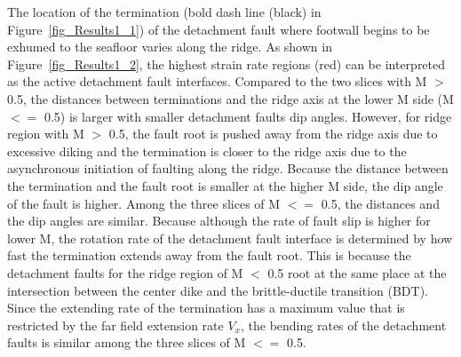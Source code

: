 The location of the termination (bold dash line (black) in Figure~\hyperref[fig_Results1_1]{\ref{fig_Results1_1}}) of the detachment fault where footwall begins to be exhumed to the seafloor varies along the ridge. As shown in Figure~\hyperref[fig_Results1_2]{\ref{fig_Results1_2}}, the highest strain rate regions (red) can be interpreted as the active detachment fault interfaces. Compared to the two slices with M $>$ 0.5, the distances between terminations and the ridge axis at the lower M side (M $<=$ 0.5) is larger with smaller detachment faults dip angles. However, for ridge region with M $>$ 0.5, the fault root is pushed away from the ridge axis due to excessive diking and the termination is closer to the ridge axis due to the asynchronous initiation of faulting along the ridge. Because the distance between the termination and the fault root is smaller at the higher M side, the dip angle of the fault is higher. Among the three slices of M $<=$ 0.5, the distances and the dip angles are similar. Because although the rate of fault slip is higher for lower M, the rotation rate of the detachment fault interface is determined by how fast the termination extends away from the fault root. This is because the detachment faults for the ridge region of M $<$ 0.5 root at the same place at the intersection between the center dike and the brittle-ductile transition (BDT). Since the extending rate of the termination has a maximum value that is restricted by the far field extension rate $V_{x}$, the bending rates of the detachment faults is similar among the three slices of M $<=$ 0.5.  %
